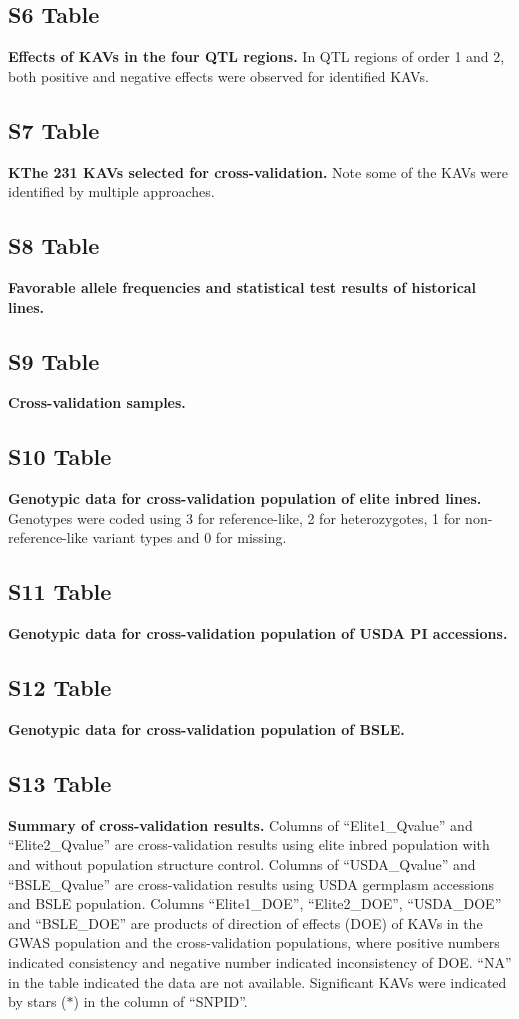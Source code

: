 \documentclass[10pt,letterpaper]{article}
\begin{document}
\subsection*{S6 Table}
\label{Table_S6}
{\bf Effects of KAVs in the four QTL regions.} In QTL regions of order 1 and 2, both positive and negative effects were observed for identified KAVs. 

\subsection*{S7 Table}
\label{Table_S7}
{\bf KThe 231 KAVs selected for cross-validation.} Note some of the KAVs were identified by multiple approaches. 

\subsection*{S8 Table}
\label{Table_S8}
{\bf Favorable allele frequencies and statistical test results of historical lines. }

\subsection*{S9 Table}
\label{Table_S9}
{\bf Cross-validation samples.}

\subsection*{S10 Table}
\label{Table_S10}
{\bf Genotypic data for cross-validation population of elite inbred lines.} Genotypes were coded using 3 for reference-like, 2 for heterozygotes, 1 for non-reference-like variant types and 0 for missing.

\subsection*{S11 Table}
\label{Table_S11}
{\bf Genotypic data for cross-validation population of USDA PI accessions.}

\subsection*{S12 Table}
\label{Table_S12}
{\bf Genotypic data for cross-validation population of BSLE.}

\subsection*{S13 Table}
\label{Table_S13}
{\bf Summary of cross-validation results.} 
Columns of “Elite1\_Qvalue” and “Elite2\_Qvalue” are cross-validation results using elite inbred population with and without population structure control. Columns of “USDA\_Qvalue” and “BSLE\_Qvalue” are cross-validation results using USDA germplasm accessions and BSLE population. Columns “Elite1\_DOE”, “Elite2\_DOE”, “USDA\_DOE” and “BSLE\_DOE” are products of direction of effects (DOE) of KAVs in the GWAS population and the cross-validation populations, where positive numbers indicated consistency and negative number indicated inconsistency of DOE. “NA” in the table indicated the data are not available. Significant KAVs were indicated by stars ($\ast$) in the column of “SNPID”.
\end{document}
